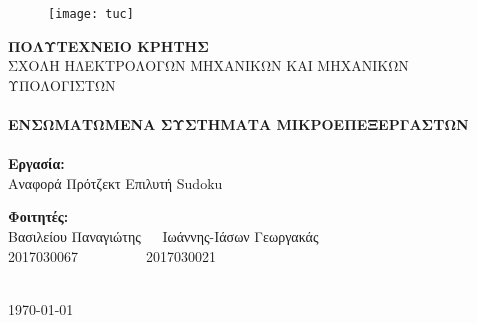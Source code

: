 \begin{titlepage}
\centering
\begin{figure}[h!]
\centering
\texttt{[image: tuc]}
\end{figure}
\textbf{\large ΠΟΛΥΤΕΧΝΕΙΟ ΚΡΗΤΗΣ}\\[0.3CM]
ΣΧΟΛΗ ΗΛΕΚΤΡΟΛΟΓΩΝ ΜΗΧΑΝΙΚΩΝ ΚΑΙ ΜΗΧΑΝΙΚΩΝ ΥΠΟΛΟΓΙΣΤΩΝ\\[1cm]
\HRule\\[0.15cm]
\Large{\textbf{ΕΝΣΩΜΑΤΩΜΕΝΑ ΣΥΣΤΗΜΑΤΑ ΜΙΚΡΟΕΠΕΞΕΡΓΑΣΤΩΝ}}\\[0.05cm]
\HRule\\[1cm]
\Large{\textbf{Εργασία:}}\\
\Large{Αναφορά Πρότζεκτ Επιλυτή Sudoku}\\[1.5cm]
\begin{minipage}{0.9\textwidth}
\begin{flushleft}
\textbf{Φοιτητές:}\\
Βασιλείου Παναγιώτης$~~~~~~~$Ιωάννης-Ιάσων Γεωργακάς\\
2017030067$~~~~~~~~~~~~~~~~~~~~~~$2017030021\\[0.5cm]
\end{flushleft}
\end{minipage}\\[2cm]
{\large\today}\\
\end{titlepage}